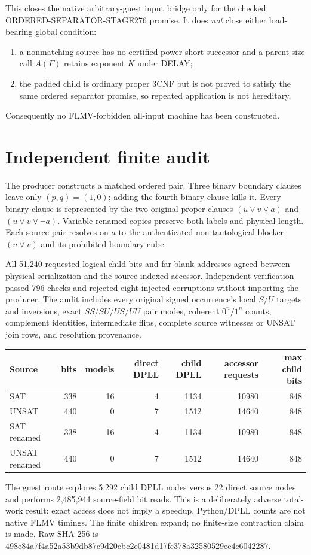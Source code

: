 \documentclass[11pt]{article}
\begin{document}
This closes the native arbitrary-guest input bridge only for the checked ORDERED-SEPARATOR-STAGE276 promise.  It does \emph{not} close either load-bearing global condition:
\begin{enumerate}
\item a nonmatching source has no certified power-short successor and a parent-size call $A(F)$ retains exponent $K$ under DELAY;
\item the padded child is ordinary proper 3CNF but is not proved to satisfy the same ordered separator promise, so repeated application is not hereditary.
\end{enumerate}
Consequently no FLMV-forbidden all-input machine has been constructed.

\section{Independent finite audit}
The producer constructs a matched ordered pair.  Three binary boundary clauses leave only $(p,q)=(1,0)$; adding the fourth binary clause kills it.  Every binary clause is represented by the two original proper clauses $(u\vee v\vee a)$ and $(u\vee v\vee\neg a)$.  Variable-renamed copies preserve both labels and physical length.  Each source pair resolves on $a$ to the authenticated non-tautological blocker $(u\vee v)$ and its prohibited boundary cube.

All 51,240 requested logical child bits and far-blank addresses agreed between physical serialization and the source-indexed accessor.  Independent verification passed 796 checks and rejected eight injected corruptions without importing the producer.  The audit includes every original signed occurrence's local $S/U$ targets and inversions, exact $SS/SU/US/UU$ pair modes, coherent $0^n/1^n$ counts, complement identities, intermediate flips, complete source witnesses or UNSAT join rows, and resolution provenance.

\begin{center}\begin{tabular}{lrrrrrr}\toprule
Source & bits & models & direct DPLL & child DPLL & accessor requests & max child bits\\\midrule
SAT &338&16&4&1134&10980&848\\
UNSAT &440&0&7&1512&14640&848\\
SAT renamed &338&16&4&1134&10980&848\\
UNSAT renamed &440&0&7&1512&14640&848\\\bottomrule
\end{tabular}\end{center}
The guest route explores 5,292 child DPLL nodes versus 22 direct source nodes and performs 2,485,944 source-field bit reads.  This is a deliberately adverse total-work result: exact access does not imply a speedup.  Python/DPLL counts are not native FLMV timings.  The finite children expand; no finite-size contraction claim is made.  Raw SHA-256 is
\url{498e84a7f4a52a53b9db87c9d20cbc2e0481d17fc378a32580529ee4e6042287}.
\end{document}
